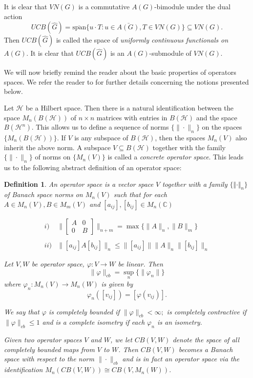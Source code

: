 \documentclass[10pt]{amsart}
\newtheorem{defn}[thm]{Definition}
\numberwithin{thm}{section}
\numberwithin{equation}{section}
\begin{document}
It is clear that $VN(G)$ is a commutative $A(G)$-bimodule under the dual action 
\[UCB(\widehat {G})=\bar {\overline{\text{span}}\{u\cdot T : u\in A(G),T\in VN(G)\}}\subseteq VN(G).\]
Then $UCB(\widehat {G})$ is called the space of \textit{uniformly continuous functionals on} 
$A(G)$.
It is clear that $UCB(\widehat {G})$ is an $A(G)$-submodule of $VN(G)$. 

We will now briefly remind the reader about the basic properties of operators spaces.
We refer the reader to \cite{ER00} for further details concerning the notions presented below. 

Let $\mathcal{H}$ be a Hilbert space. Then there is a natural identification between the space
$M_n(B(\mathcal{H}))$ of $n\times n$ matrices with entries in $B(\mathcal{H})$ and the space 
$B(\mathcal{H}^n)$. This allows us to define a sequence of norms $\{\| \cdot \| _n\}$ on the spaces
$\{M_n(B(\mathcal{H}))\}$. If $V$ is any subspace of $B(\mathcal{H})$, then the spaces 
$M_n(V)$ also inherit the above norm. A subspace $V\subseteq B(\mathcal{H})$ together with the family 
$\{\| \cdot \| _n\}$ of norms on $\{M_n(V)\}$ is called a \textit{concrete operator space}. This 
leads us to the following abstract definition of an operator space: 

\begin{defn}
An operator space is a vector space $V$ together with a family $\{{\left\Vert{\cdot}\right\Vert}_{n}\}$ of Banach space norms on $M_{n}(V)$ such that for each
$A\in M_{n}(V),B\in M_{m}(V)$ and $[a_{ij}],[b_{ij}]\in M_{n}(\mathbb{C})$

\[
\begin{array}{ll}
i) & \parallel \left[ 
\begin{array}{ll}
A & 0 \\ 
0 & B
\end{array}
\right] \parallel _{n+m}=\max \{\parallel A\parallel _{n},\parallel
B\parallel _{m}\} \\ 
& \\
ii) & \parallel [a_{ij}]A[b_{ij}]\parallel _{n}\leq \parallel
[a_{ij}]\parallel \parallel A\parallel _{n}\parallel [b_{ij}]\parallel _{n}\end{array}
\]

Let $V,W$ be operator space, $\varphi :V\rightarrow W$ be linear. Then
\[
\parallel \varphi \parallel _{cb}=\sup_n \{\parallel \varphi _{n}\parallel \}
\]
where $\varphi _{n}:M_{n}(V)\rightarrow M_{n}(W)$ is given by 
\[
\varphi _{n}([v_{ij}])=[\varphi (v_{ij})].
\]

We say that $\varphi $ is completely bounded if $\parallel \varphi \parallel_{cb}<\infty ;$
is completely contractive if $\parallel \varphi \parallel_{cb}\leq 1$ and is a complete isometry if each $\varphi _{n}$ is an isometry.

Given two operator spaces $V$ and $W$, we let $CB(V,W)$ denote the space of all completely 
bounded maps from $V$ to $W$. Then $CB(V,W)$ becomes a Banach space with respect to the norm 
$\| \cdot \| _{cb}$ and is in fact an operator space via the identification $M_n(CB(V,W))\cong 
CB(V,M_n(W))$.  
\end{defn}
\end{document}

